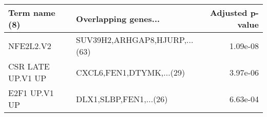 \begin{tabular}{llr}
\toprule
    Term name (8) &          Overlapping genes... &  Adjusted p-value \\
\midrule
        NFE2L2.V2 & SUV39H2,ARHGAP8,HJURP,...(63) &          1.09e-08 \\
CSR LATE UP.V1 UP &      CXCL6,FEN1,DTYMK,...(29) &          3.97e-06 \\
    E2F1 UP.V1 UP &        DLX1,SLBP,FEN1,...(26) &          6.63e-04 \\
\bottomrule
\end{tabular}

